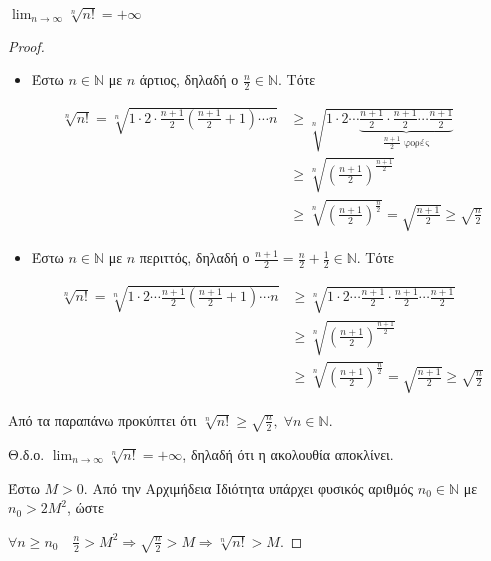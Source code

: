 \documentclass[main.tex]{subfiles}
\begin{document}
\begin{prop}
    $ \lim_{n \to \infty} \sqrt[n]{n!} = +\infty $ 
\end{prop}


\begin{proof}
\item {}
    \begin{itemize}
        \item 
            Έστω $ n \in \mathbb{N} $ με $ n $ άρτιος, δηλαδή ο 
            $ \frac{n}{2} \in \mathbb{N} $. Τότε

            \begin{align*}
                \sqrt[n]{n!} = \sqrt[n]{1 \cdot 2 \cdot \frac{n+1}{2}
                \left(\frac{n+1}{2} +1\right) \cdots n} 
                    &\geq \sqrt[n]{1\cdot 2 \cdots
                        \underbrace{\frac{n+1}{2} \cdot \frac{n+1}{2} 
                            \cdots \frac{n+1}{2}}_{\frac{n+1}{2} \; 
                    \text{φορές}}} \\
                    &\geq \sqrt[n]{\left(\frac{n+1}{2}\right)^
                    {\frac{n+1}{2}}} \\ 
                    &\geq \sqrt[n]{\left(\frac{n+1}{2}\right)^
                    {\frac{n}{2}}} = \sqrt{ \frac{n+1}{2} } \geq 
                    \sqrt{\frac{n}{2}} 
            \end{align*} 

        \item Έστω $ n \in \mathbb{N} $ με $ n $ περιττός, δηλαδή ο $
            \frac{n+1}{2} = \frac{n}{2} + \frac{1}{2} \in \mathbb{N} $.
            Τότε

            \begin{align*}
                \sqrt[n]{n!} = \sqrt[n]{1\cdot 2 \cdots \frac{n+1}{2}
                \left(\frac{n+1}{2} +1\right) \cdots n}
             &\geq \sqrt[n]{1 \cdot 2 \cdots
             \frac{n+1}{2}  \cdot \frac{n+1}{2} \cdots \frac{n+1}{2} } \\ 
             &\geq 
             \sqrt[n]{\left(\frac{n+1}{2} \right)^{\frac{n+1}{2}}} \\ 
             & \geq
             \sqrt[n]{\left(\frac{n+1}{2} \right)^{\frac{n}{2}}} = 
             \sqrt{\frac{n+1}{2}} \geq 
             \sqrt{\frac{n}{2}}
            \end{align*}
    \end{itemize}

    Από τα παραπάνω προκύπτει ότι $ \sqrt[n]{n!} \geq \sqrt{\frac{n}{2}
    }, \; \forall n \in \mathbb{N} $. 

    Θ.δ.ο. $ \lim_{n \to \infty} \sqrt[n]{n!} = + \infty $, 
    δηλαδή ότι η ακολουθία αποκλίνει.

    Έστω $ M >0 $. Από την Αρχιμήδεια Ιδιότητα υπάρχει 
    φυσικός αριθμός $ 
    n_{0} \in  \mathbb{N} $ με $ n_{0}>2M^{2} $, ώστε 

    $ \forall n \geq n_{0} \quad \frac{n}{2} > M^{2} \Rightarrow
    \sqrt{\frac{n}{2}} > M \Rightarrow \sqrt[n]{n!} > M $. 
\end{proof}
\end{document}
